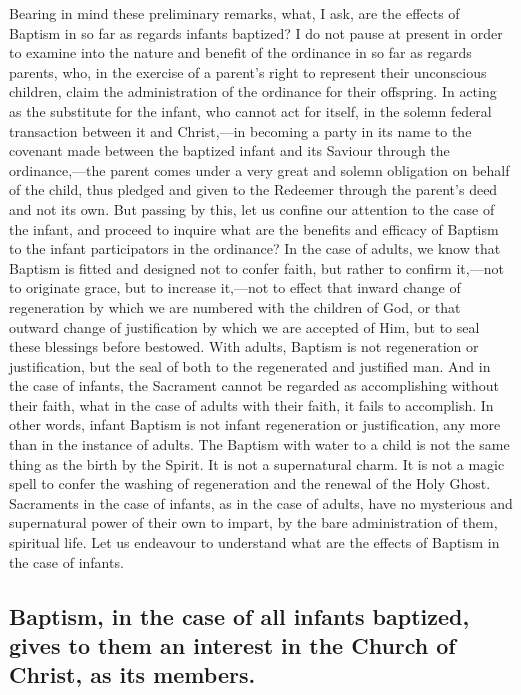 \documentclass[]{book}
\begin{document}
Bearing in mind these preliminary remarks, what, I ask, are the effects of Baptism in so far as regards infants baptized? I do not pause at present in order to examine into the nature and benefit of the ordinance in so far as regards parents, who, in the exercise of a parent's right to represent their unconscious children, claim the administration of the ordinance for their offspring. In acting as the substitute for the infant, who cannot act for itself, in the solemn federal transaction between it and Christ,---in becoming a party in its name to the covenant made between the baptized infant and its Saviour through the ordinance,---the parent comes under a very great and solemn obligation on behalf of the child, thus pledged and given to the Redeemer through the parent's deed and not its own. But passing by this, let us confine our attention to the case of the infant, and proceed to inquire what are the benefits and efficacy of Baptism to the infant participators in the ordinance? In the case of adults, we know that Baptism is fitted and designed not to confer faith, but rather to confirm it,---not to originate grace, but to increase it,---not to effect that inward change of regeneration by which we are numbered with the children of God, or that outward change of justification by which we are accepted of Him, but to seal these blessings before bestowed. With adults, Baptism is not regeneration or justification, but the seal of both to the regenerated and justified man. And in the case of infants, the Sacrament cannot be regarded as accomplishing without their faith, what in the case of adults with their faith, it fails to accomplish. In other words, infant Baptism is not infant regeneration or justification, any more than in the instance of adults. The Baptism with water to a child is not the same thing as the birth by the Spirit. It is not a supernatural charm. It is not a magic spell to confer the washing of regeneration and the renewal of the Holy Ghost. Sacraments in the case of infants, as in the case of adults, have no mysterious and supernatural power of their own to impart, by the bare administration of them, spiritual life. Let us endeavour to understand what are the effects of Baptism in the case of infants.

\hypertarget{baptism-in-the-case-of-all-infants-baptized-gives-to-them-an-interest-in-the-church-of-christ-as-its-members.}{%
\subsection{Baptism, in the case of all infants baptized, gives to them an interest in the Church of Christ, as its members.}\label{baptism-in-the-case-of-all-infants-baptized-gives-to-them-an-interest-in-the-church-of-christ-as-its-members.}}
\end{document}
